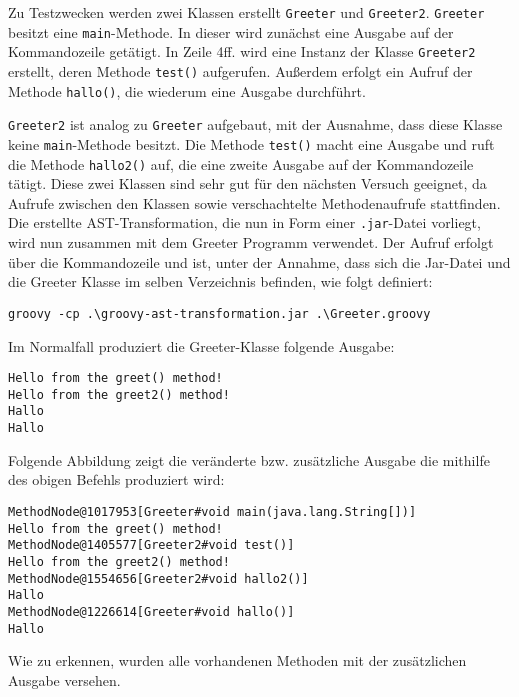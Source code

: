 Zu Testzwecken werden zwei Klassen erstellt \texttt{Greeter} und \texttt{Greeter2}. 
\texttt{Greeter} besitzt eine \texttt{main}-Methode. 
In dieser wird zunächst eine Ausgabe auf der Kommandozeile getätigt. 
In Zeile 4ff. wird eine Instanz der Klasse \texttt{Greeter2} erstellt, deren Methode \texttt{test()} aufgerufen. Außerdem erfolgt ein Aufruf der Methode \texttt{hallo()}, die wiederum eine Ausgabe durchführt.

\texttt{Greeter2} ist analog zu \texttt{Greeter} aufgebaut, mit der Ausnahme, dass diese Klasse keine \texttt{main}-Methode besitzt. 
Die Methode \texttt{test()} macht eine Ausgabe und ruft die Methode \texttt{hallo2()} auf, die eine zweite Ausgabe auf der Kommandozeile tätigt.
Diese zwei Klassen sind sehr gut für den nächsten Versuch geeignet, da Aufrufe zwischen den Klassen sowie verschachtelte Methodenaufrufe stattfinden.
Die erstellte AST-Transformation, die nun in Form einer \texttt{.jar}-Datei vorliegt, wird nun zusammen mit dem Greeter Programm verwendet. 
Der Aufruf erfolgt über die Kommandozeile und ist, unter der Annahme, dass sich die Jar-Datei und die Greeter Klasse im selben Verzeichnis befinden, wie folgt definiert:

\begin{lstlisting}[frame=none]
groovy -cp .\groovy-ast-transformation.jar .\Greeter.groovy
\end{lstlisting}

Im Normalfall produziert die Greeter-Klasse folgende Ausgabe:

\begin{lstlisting}[frame=none]
Hello from the greet() method!
Hello from the greet2() method!
Hallo
Hallo
\end{lstlisting}


Folgende Abbildung zeigt die veränderte bzw. zusätzliche Ausgabe die mithilfe des obigen Befehls produziert wird:


\begin{lstlisting}[frame=none]
MethodNode@1017953[Greeter#void main(java.lang.String[])]
Hello from the greet() method!
MethodNode@1405577[Greeter2#void test()]
Hello from the greet2() method!
MethodNode@1554656[Greeter2#void hallo2()]
Hallo
MethodNode@1226614[Greeter#void hallo()]
Hallo
\end{lstlisting}


Wie zu erkennen, wurden alle vorhandenen Methoden mit der zusätzlichen Ausgabe versehen. 


